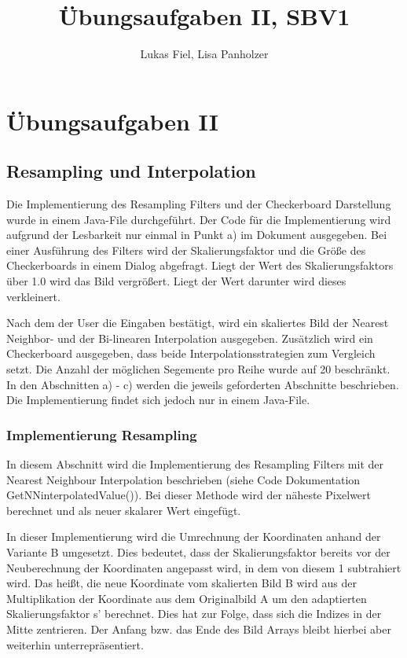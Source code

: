 \documentclass[12pt,german]{article}
\begin{document}
\title{Übungsaufgaben II, SBV1 }
\author{Lukas Fiel, Lisa Panholzer}
\maketitle


\newpage
\section{Übungsaufgaben II}
\subsection{Resampling und Interpolation}
Die Implementierung des Resampling Filters und der Checkerboard Darstellung wurde in einem Java-File durchgeführt. Der Code für die Implementierung wird aufgrund der Lesbarkeit nur einmal in Punkt a)  im Dokument ausgegeben. Bei einer Ausführung des Filters wird der Skalierungsfaktor und die Größe des Checkerboards in einem Dialog abgefragt. Liegt der Wert des Skalierungsfaktors über 1.0 wird das Bild vergrößert. Liegt der Wert darunter wird dieses verkleinert.

 Nach dem der User die Eingaben bestätigt, wird ein skaliertes Bild der Nearest Neighbor- und der Bi-linearen Interpolation ausgegeben. Zusätzlich wird ein Checkerboard ausgegeben, dass beide Interpolationsstrategien zum Vergleich setzt. Die Anzahl der möglichen Segemente pro Reihe wurde auf 20 beschränkt. In den Abschnitten a) - c) werden die jeweils geforderten Abschnitte beschrieben. Die Implementierung findet sich jedoch nur in einem Java-File.

\subsubsection{Implementierung Resampling}
In diesem Abschnitt wird die Implementierung des Resampling Filters mit der Nearest Neighbour Interpolation beschrieben (siehe Code Dokumentation GetNNinterpolatedValue()). Bei dieser Methode wird der näheste Pixelwert berechnet und als neuer skalarer Wert eingefügt.

In dieser Implementierung wird die Umrechnung der Koordinaten anhand der Variante B umgesetzt. Dies bedeutet, dass der Skalierungsfaktor bereits vor der Neuberechnung der Koordinaten angepasst wird, in dem von diesem 1 subtrahiert wird. Das heißt, die neue Koordinate vom skalierten Bild B wird aus der Multiplikation der Koordinate aus dem Originalbild A um den adaptierten Skalierungsfaktor s' berechnet. Dies hat zur Folge, dass sich die Indizes in der Mitte zentrieren. Der Anfang bzw. das Ende des Bild Arrays bleibt hierbei aber weiterhin unterrepräsentiert.\\
\end{document}
